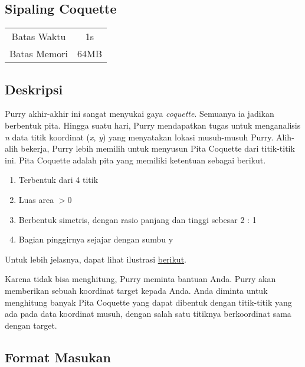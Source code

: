 \documentclass{article}
\begin{document}
\begin{center}

    
    \section*{Sipaling Coquette}

    \begin{tabular}{ | c c | }
        \hline
        Batas Waktu  & 1s \\
        Batas Memori & 64MB \\
        \hline
    \end{tabular}
\end{center}

\subsection*{Deskripsi}

Purry akhir-akhir ini sangat menyukai gaya \textit{coquette}. Semuanya ia jadikan berbentuk pita. Hingga suatu hari, Purry mendapatkan tugas untuk menganalisis \textit{n} data titik koordinat (\textit{x}, \textit{y}) yang menyatakan lokasi musuh-musuh Purry. Alih-alih bekerja, Purry lebih memilih untuk menyusun Pita Coquette dari titik-titik ini.\newline
Pita Coquette adalah pita yang memiliki ketentuan sebagai berikut.
\begin{enumerate}
    \item Terbentuk dari 4 titik
    \item Luas area \(> 0\)
    \item Berbentuk simetris, dengan rasio panjang dan tinggi sebesar 2 : 1
    \item Bagian pinggirnya sejajar dengan sumbu y
\end{enumerate}

Untuk lebih jelasnya, dapat lihat ilustrasi \href{https://drive.google.com/file/d/1eYyaiV1-mpoYWLuBTnvTJsZTsRzAdQep/view?usp=drive_link}{berikut}.

Karena tidak bisa menghitung, Purry meminta bantuan Anda. Purry akan memberikan sebuah koordinat target kepada Anda. Anda diminta untuk menghitung banyak Pita Coquette yang dapat dibentuk dengan titik-titik yang ada pada data koordinat musuh, dengan salah satu titiknya berkoordinat sama dengan target.

\subsection*{Format Masukan}
\end{document}
